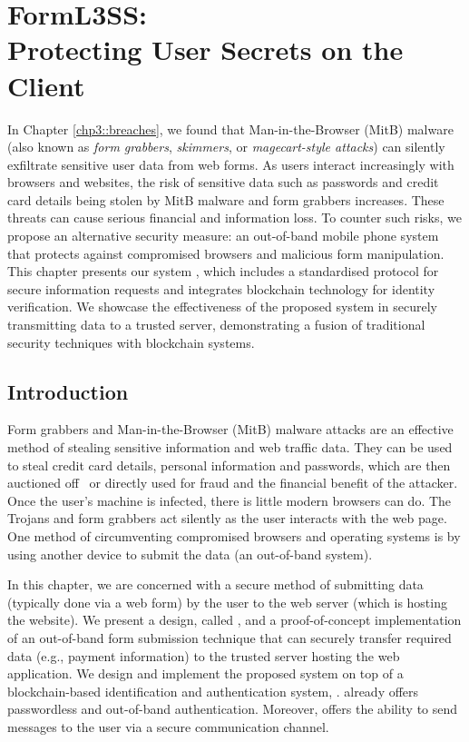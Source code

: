 \chapter{FormL3SS:\,\\Protecting User Secrets on the Client}
\label{chp::formless}

In Chapter \ref{chp3::breaches}, we found that Man-in-the-Browser (MitB) malware (also known as \textit{form grabbers}, \textit{skimmers}, or \textit{magecart-style attacks}) can silently exfiltrate sensitive user data from web forms. As users interact increasingly with browsers and websites, the risk of sensitive data such as passwords and credit card details being stolen by MitB malware and form grabbers increases. These threats can cause serious financial and information loss. To counter such risks, we propose an alternative security measure: an out-of-band mobile phone system that protects against compromised browsers and malicious form manipulation. This chapter presents our system \formless, which includes a standardised protocol for secure information requests and integrates blockchain technology for identity verification. We showcase the effectiveness of the proposed system in securely transmitting data to a trusted server, demonstrating a fusion of traditional security techniques with blockchain systems.

\section{Introduction}
Form grabbers and Man-in-the-Browser (MitB) malware attacks are an effective method of stealing sensitive information and web traffic data. They can be used to steal credit card details, personal information and passwords, which are then auctioned off~\cite{dupont_darkode:_2017} or directly used for fraud and the financial benefit of the attacker. Once the user's machine is infected, there is little modern browsers can do. The Trojans and form grabbers act silently as the user interacts with the web page. One method of circumventing compromised browsers and operating systems is by using another device to submit the data (an out-of-band system).

In this chapter, we are concerned with a secure method of submitting data (typically done via a web form) by the user to the web server (which is hosting the website). We present a design, called \formless, and a proof-of-concept implementation of an out-of-band form submission technique that can securely transfer required data (e.g., payment information) to the trusted server hosting the web application. We design and implement the proposed system on top of a blockchain-based identification and authentication system, \deeid. \deeid already offers passwordless and out-of-band authentication. Moreover, \deeid offers the ability to send messages to the user via a secure communication channel.


